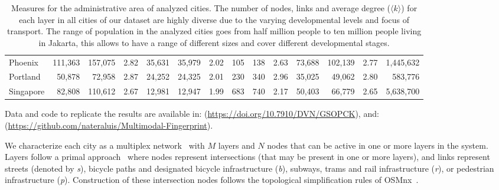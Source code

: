 \begin{table}[ht!]
\begin{adjustbox}{width=\textwidth,keepaspectratio}
\begin{tabular}{l|rrr|rrr|rrr|rrr|r}
			Phoenix    & 111,363                         & 157,075                      & 2.82                      & 35,631                      & 35,979     & 2.02                & 105   & 138   & 2.63                & 73,688  & 102,139 & 2.77                  & 1,445,632  \\
			Portland   & 50,878                          & 72,958                       & 2.87                      & 24,252                      & 24,325     & 2.01                & 230   & 340   & 2.96                & 35,025  & 49,062  & 2.80                  & 583,776    \\
			Singapore  & 82,808                          & 110,612                      & 2.67                      & 12,981                      & 12,947     & 1.99                & 683   & 740   & 2.17                & 50,403  & 66,779  & 2.65                  & 5,638,700
		\end{tabular}
	\end{adjustbox}
	\caption[Layers measures for analyzed cities]{Measures for the administrative area of analyzed cities. The number of nodes, links and average degree ($\langle k \rangle$) for each layer in all cities of our dataset are highly diverse due to the varying developmental levels and focus of transport. The range of population in the analyzed cities goes from half million people to ten million people living in Jakarta, this allows to
		have a range of different sizes and cover different developmental stages.
		\label{tab:MultiplexCities}}
\end{table}

Data and code to replicate the results are available in: (\url{https://doi.org/10.7910/DVN/GSOPCK}), and: (\url{https://github.com/nateraluis/Multimodal-Fingerprint}).

We characterize each city as a multiplex network~\cite{Boccaletti2014Structure,Kivela2014Multilayer,Battiston2017Challenges} with $M$ layers and $N$ nodes that can be active in one or more layers in the system. Layers follow a primal approach~\cite{Porta2006Primal} where nodes represent intersections (that may be present in one or more layers), and links represent streets (denoted by \textit{s}), bicycle paths and designated bicycle infrastructure (\textit{b}), subways, trams and rail infrastructure (\textit{r}), or pedestrian infrastructure (\textit{p}). Construction of these intersection nodes follows the topological simplification rules of OSMnx~\cite{Boeing2017OSMNX}.

